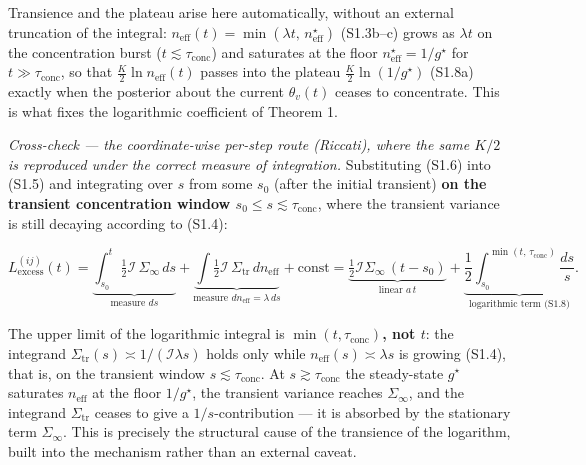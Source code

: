 \documentclass[12pt]{iopart}
\begin{document}
Transience and the plateau arise here automatically, without an external truncation of the integral: \(n_{\text{eff}}(t)=\min(\lambda t,\,n_{\text{eff}}^\star)\) (S1.3b--c) grows as \(\lambda t\) on the concentration burst (\(t\lesssim\tau_{\text{conc}}\)) and saturates at the floor \(n_{\text{eff}}^\star=1/g^\star\) for \(t\gg\tau_{\text{conc}}\), so that \(\tfrac{K}{2}\ln n_{\text{eff}}(t)\) passes into the plateau \(\tfrac{K}{2}\ln(1/g^\star)\) (S1.8a) exactly when the posterior about the current \(\theta_v(t)\) ceases to concentrate. This is what fixes the logarithmic coefficient of Theorem 1.



\emph{Cross-check --- the coordinate-wise per-step route (Riccati), where the same \(K/2\) is reproduced under the correct measure of integration.} Substituting (S1.6) into (S1.5) and integrating over \(s\) from some \(s_0\) (after the initial transient) \textbf{on the transient concentration window \(s_0 \le s \lesssim \tau_{\text{conc}}\)}, where the transient variance is still decaying according to (S1.4):



\begin{equation}L_{\text{excess}}^{(ij)}(t) = \underbrace{\int_{s_0}^t \tfrac12\mathcal I\,\Sigma_\infty\,ds}_{\text{measure } ds} + \underbrace{\int \tfrac12\mathcal I\,\Sigma_{\text{tr}}\,dn_{\text{eff}}}_{\text{measure } dn_{\text{eff}}=\lambda\,ds} + \text{const} = \underbrace{\tfrac12\mathcal I\Sigma_\infty\,(t-s_0)}_{\text{linear } a\,t} + \underbrace{\frac12\int_{s_0}^{\min(t,\,\tau_{\text{conc}})}\frac{ds}{s}}_{\text{logarithmic term (S1.8)}}. \tag{S1.7}\end{equation}



The upper limit of the logarithmic integral is \textbf{\(\min(t,\tau_{\text{conc}})\), not \(t\)}: the integrand \(\Sigma_{\text{tr}}(s) \asymp 1/(\mathcal I\lambda s)\) holds only while \(n_{\text{eff}}(s)\asymp\lambda s\) is growing (S1.4), that is, on the transient window \(s \lesssim \tau_{\text{conc}}\). At \(s \gtrsim \tau_{\text{conc}}\) the steady-state \(g^\star\) saturates \(n_{\text{eff}}\) at the floor \(1/g^\star\), the transient variance reaches \(\Sigma_\infty\), and the integrand \(\Sigma_{\text{tr}}\) ceases to give a \(1/s\)-contribution --- it is absorbed by the stationary term \(\Sigma_\infty\). This is precisely the structural cause of the transience of the logarithm, built into the mechanism rather than an external caveat.
\end{document}
